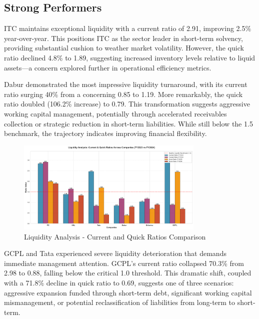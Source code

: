 \documentclass[12pt, a4paper]{report}
\begin{document}
\subsection{Strong Performers}

ITC maintains exceptional liquidity with a current ratio of 2.91, improving 2.5\% year-over-year. This positions ITC as the sector leader in short-term solvency, providing substantial cushion to weather market volatility. However, the quick ratio declined 4.8\% to 1.89, suggesting increased inventory levels relative to liquid assets—a concern explored further in operational efficiency metrics.

Dabur demonstrated the most impressive liquidity turnaround, with its current ratio surging 40\% from a concerning 0.85 to 1.19. More remarkably, the quick ratio doubled (106.2\% increase) to 0.79. This transformation suggests aggressive working capital management, potentially through accelerated receivables collection or strategic reduction in short-term liabilities. While still below the 1.5 benchmark, the trajectory indicates improving financial flexibility.

\begin{figure}[H]
    \centering
    \includegraphics[width=0.8\textwidth]{assets/imperative_analysis/liquidity_analysis.png}
    \caption{Liquidity Analysis - Current and Quick Ratios Comparison}
\end{figure}

\vspace{0.3cm}

GCPL and Tata experienced severe liquidity deterioration that demands immediate management attention. GCPL's current ratio collapsed 70.3\% from 2.98 to 0.88, falling below the critical 1.0 threshold. This dramatic shift, coupled with a 71.8\% decline in quick ratio to 0.69, suggests one of three scenarios: aggressive expansion funded through short-term debt, significant working capital mismanagement, or potential reclassification of liabilities from long-term to short-term.
\end{document}
